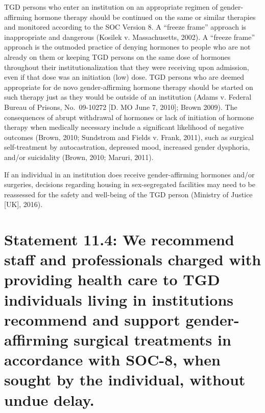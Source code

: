 \documentclass[
]{book}
\begin{document}
TGD persons who enter an institution on an
appropriate regimen of gender-affirming hormone
therapy should be continued on the same or similar therapies and monitored according to the
SOC Version 8. A ``freeze frame'' approach is
inappropriate and dangerous (Kosilek v.
Massachusetts, 2002). A ``freeze frame'' approach
is the outmoded practice of denying hormones
to people who are not already on them or keeping TGD persons on the same dose of hormones
throughout their institutionalization that they
were receiving upon admission, even if that dose
was an initiation (low) dose. TGD persons who
are deemed appropriate for de novo
gender-affirming hormone therapy should be
started on such therapy just as they would be
outside of an institution (Adams v. Federal Bureau
of Prisons, No.~09-10272 {[}D. MO June 7, 2010{]};
Brown 2009). The consequences of abrupt withdrawal of hormones or lack of initiation of hormone therapy when medically necessary include
a significant likelihood of negative outcomes
(Brown, 2010; Sundstrom and Fields v. Frank,
2011), such as surgical self-treatment by autocastration, depressed mood, increased gender dysphoria, and/or suicidality (Brown, 2010;
Maruri, 2011).

If an individual in an institution does receive
gender-affirming hormones and/or surgeries,
decisions regarding housing in sex-segregated
facilities may need to be reassessed for the safety
and well-being of the TGD person (Ministry of
Justice {[}UK{]}, 2016).

\hypertarget{statement-11.4-we-recommend-staff-and-professionals-charged-with-providing-health-care-to-tgd-individuals-living-in-institutions-recommend-and-support-gender-affirming-surgical-treatments-in-accordance-with-soc-8-when-sought-by-the-individual-without-undue-delay.}{%
\section*{Statement 11.4: We recommend staff and professionals charged with providing health care to TGD individuals living in institutions recommend and support gender-affirming surgical treatments in accordance with SOC-8, when sought by the individual, without undue delay.}\label{statement-11.4-we-recommend-staff-and-professionals-charged-with-providing-health-care-to-tgd-individuals-living-in-institutions-recommend-and-support-gender-affirming-surgical-treatments-in-accordance-with-soc-8-when-sought-by-the-individual-without-undue-delay.}}
\end{document}
